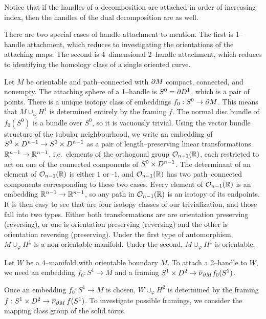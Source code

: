 Notice that if the handles of a decomposition are attached in order of increasing index, then the handles of the dual decomposition are as well.

There are two special cases of handle attachment to mention.
The first is 1--handle attachment, which reduces to investigating the orientations of the attaching maps.
The second is 4--dimensional 2--handle attachment, which reduces to identifying the homology class of a single oriented curve.

\begin{rmk}
	\label{rmk:1handle}
	Let $M$ be orientable and path--connected with $\partial M$ compact, connected, and nonempty.
	The attaching sphere of a 1--handle is $S^0=\partial D^1$, which is a pair of points.
	There is a unique isotopy class of embeddings $f_0:S^0\to\partial M$.
	This means that $M\cup_\varphi H^1$ is determined entirely by the framing $f$.
	The normal disc bundle of $f_0(S^0)$ is a bundle over $S^0$, so it is vacuously trivial.
	Using the vector bundle structure of the tubular neighbourhood, we write an embedding of $S^0\times D^{n-1}\to S^0\times D^{n-1}$ as a pair of length--preserving linear transformations $\mathbb{R}^{n-1}\to\mathbb{R}^{n-1}$, i.e.\ elements of the orthogonal group $\mathcal{O}_{n-1}({\mathbb{R}})$, each restricted to act on one of the connected components of $S^0\times D^{n-1}$.
	The determinant of an element of $\mathcal{O}_{n-1}({\mathbb{R}})$ is either $1$ or -$1$, and $\mathcal{O}_{n-1}({\mathbb{R}})$ has two path--connected components corresponding to these two cases.
	Every element of $\mathcal{O}_{n-1}({\mathbb{R}})$ is an embedding $\mathbb{R}^{n-1}\to\mathbb{R}^{n-1}$, so any path in $\mathcal{O}_{n-1}({\mathbb{R}})$ is an isotopy of its endpoints.
	It is then easy to see that are four isotopy classes of our trivialization, and those fall into two types.
	Either both transformations are are orientation preserving (reversing), or one is orientation preserving (reversing) and the other is orientation reversing (preserving).
	Under the first type of automorphism, $M\cup_\varphi H^1$ is a non-orientable manifold.
	Under the second, $M\cup_\varphi H^1$ is orientable.
\end{rmk}

Let $W$ be a 4--manifold with orientable boundary $M$.
To attach a 2--handle to $W$, we need an embedding $f_0:S^1\to M$ and a framing $S^1\times D^2\to\overline{\nu}_{\partial M}f_0(S^1)$.

Once an embedding $f_0:S^1\to M$ is chosen, $W\cup_\varphi H^2$ is determined by the framing $f:S^1\times D^2\to \overline{\nu}_{\partial M}\,f(S^1)$.
To investigate possible framings, we consider the mapping class group of the solid torus.

